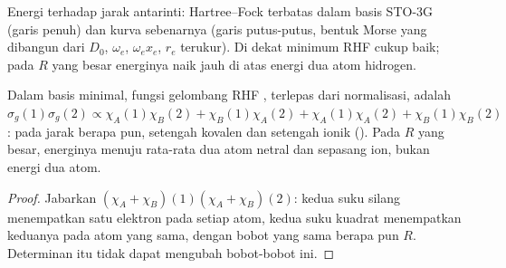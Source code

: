 \begin{omfigure}

{\small Energi  terhadap jarak antarinti: Hartree--Fock terbatas dalam
basis STO-3G (garis penuh) dan kurva sebenarnya (garis putus-putus, bentuk
Morse yang dibangun dari $D_0$, $\omega_e$, $\omega_ex_e$, $r_e$ terukur). Di
dekat minimum RHF cukup baik; pada $R$ yang besar energinya naik jauh di atas
energi dua atom hidrogen.}
\end{omfigure}

\begin{proposition}\label{prop:b3:computational-chemistry:rhf-dissociation}
Dalam basis minimal, fungsi gelombang RHF , terlepas dari normalisasi,
adalah $\sigma_g(1)\sigma_g(2) \propto \chi_A(1)\chi_B(2) + \chi_B(1)\chi_A(2)
+ \chi_A(1)\chi_A(2) + \chi_B(1)\chi_B(2)$: pada jarak berapa pun, setengah
kovalen dan setengah ionik (). Pada $R$ yang besar, energinya
menuju rata-rata dua atom netral dan sepasang ion, bukan energi dua atom.
\end{proposition}

\begin{proof}
Jabarkan $(\chi_A + \chi_B)(1)(\chi_A + \chi_B)(2)$: kedua suku silang
menempatkan satu elektron pada setiap atom, kedua suku kuadrat menempatkan
keduanya pada atom yang sama, dengan bobot yang sama berapa pun $R$.
Determinan itu tidak dapat mengubah bobot-bobot ini.
\end{proof}

